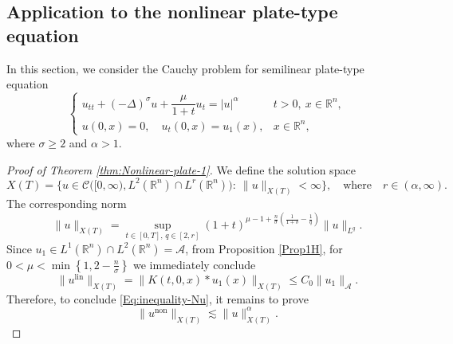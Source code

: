 \documentclass[10pt]{article}
\newcommand{\<}{\langle}
\renewcommand{\>}{\rangle}
\DeclareMathOperator{\lin}{lin}
\DeclareMathOperator{\nl}{non}
\numberwithin{equation}{section}
\newcommand{\R}{{\mathbb{R}}}
\begin{document}
\subsection{Application to the nonlinear plate-type equation}
In this section, we consider the Cauchy problem for semilinear plate-type equation
\begin{equation*} \label{eq:NP}
\begin{cases}
u_{tt} + (-\Delta)^\sigma u + \dfrac{\mu}{1+t}u_t = |u|^\alpha & t>0,\ x\in\mathbb{R}^n,\\
u(0,x)=0, \quad u_t(0,x)=u_1(x), & x\in\mathbb{R}^n,
\end{cases}
\end{equation*}
where $\sigma\geq 2$ and $\alpha>1$.
\begin{proof}[Proof of Theorem \ref{thm:Nonlinear-plate-1}]
We define the solution space
\[  X(T) = \big\{u\in \mathcal{C}\big( [0,\infty), L^2(\mathbb{R}^n)\cap L^{r}(\mathbb{R}^n) \big): \ \|u\|_{X(T)}<\infty \big\}, \quad \text{where} \quad  r\in (\alpha,\infty). \]
The corresponding norm
\[ \|u\|_{X(T)} = \sup_{t\in[0,T],\, q\in[2,r]}(1+t)^{\mu-1+\frac{n}{\sigma}\left( \frac{1}{1+\delta}-\frac{1}{q} \right)}\|u\|_{L^q}. \]
Since $u_1 \in L^1(\R^n)\cap L^2(\R^n) = \mathcal{A}$, from Proposition \ref{Prop1H}, for $0<\mu <\min\left\{1, 2-\frac{n}{\sigma}\right\}$ we immediately conclude
\[ \|u^{\lin}\|_{X(T)} = \|K(t,0,x)\ast u_1(x)\|_{X(T)} \leq C_0\|u_1\|_{\mathcal{A}}. \]
Therefore, to conclude \eqref{Eq:inequality-Nu}, it remains to prove
\[ \|u^{\nl}\|_{X(T)} \lesssim \|u\|_{X(T)}^\alpha.\]

\end{proof}
\end{document}

